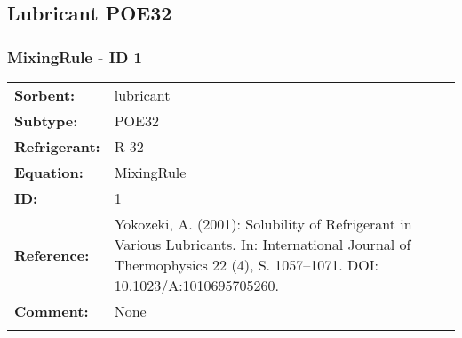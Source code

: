 \subsection{Lubricant POE32}
%
\subsubsection{MixingRule - ID 1}
%
\begin{tabular}[l]{|lp{11.5cm}|}
\hline
\addlinespace

\textbf{Sorbent:} & lubricant \\
\textbf{Subtype:} & POE32 \\
\textbf{Refrigerant:} & R-32 \\
\textbf{Equation:} & MixingRule \\
\textbf{ID:} & 1 \\
\textbf{Reference:} & Yokozeki, A. (2001): Solubility of Refrigerant in Various Lubricants. In: International Journal of Thermophysics 22 (4), S. 1057–1071. DOI: 10.1023/A:1010695705260. \\
\textbf{Comment:} & None \\

\addlinespace
\hline
\end{tabular}
\newline

